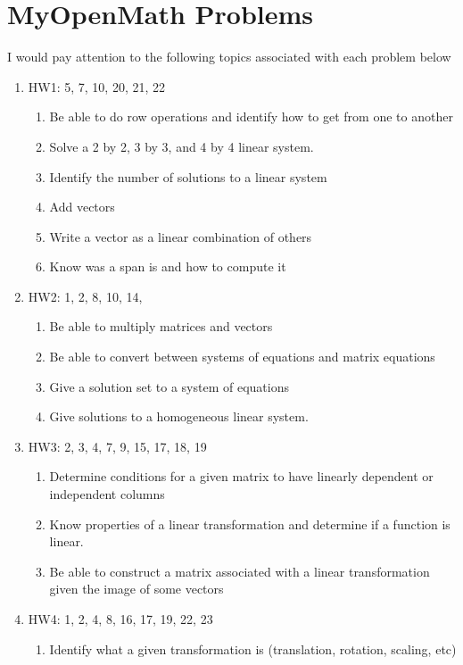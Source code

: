 \documentclass[12pt]{exam}
\begin{document}
\section{MyOpenMath Problems}
I would pay attention to the following topics associated with each problem below
\begin{enumerate}
    \item HW1: 5, 7, 10, 20, 21, 22
    \begin{enumerate}
        \item Be able to do row operations and identify how to get from one to another
        \item Solve a 2 by 2, 3 by 3, and 4 by 4 linear system.
        \item Identify the number of solutions to a linear system
        \item Add vectors
        \item Write a vector as a linear combination of others
        \item Know was a span is and how to compute it
    \end{enumerate}
    \item HW2: 1, 2, 8, 10, 14, 
    \begin{enumerate}
        \item Be able to multiply matrices and vectors
        \item Be able to convert between systems of equations and matrix equations
        \item Give a solution set to a system of equations
        \item Give solutions to a homogeneous linear system.
    \end{enumerate}
    \item HW3: 2, 3, 4, 7, 9, 15, 17, 18, 19
    \begin{enumerate}
        \item Determine conditions for a given matrix to have linearly dependent or independent
            columns
        \item Know properties of a linear transformation and determine if a function
            is linear.
        \item Be able to construct a matrix associated with a linear transformation
            given the image of some vectors
    \end{enumerate}
    \item HW4: 1, 2, 4, 8, 16, 17, 19, 22, 23
    \begin{enumerate}
        \item Identify what a given transformation is (translation, rotation, scaling, etc)

\end{enumerate}
\end{enumerate}
\end{document}
